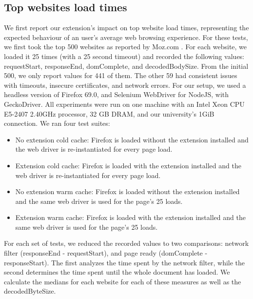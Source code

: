 \subsection{Top websites load times} \label{top_sites}
We first report our extension's impact on top website load times, representing the expected behaviour of an user's average web browsing experience. For these tests, we first took the top 500 websites as reported by Moz.com \cite{top500}. For each website, we loaded it 25 times (with a 25 second timeout) and recorded the following values: requestStart, responseEnd, domComplete, and decodedBodySize. From the initial 500, we only report values for 441 of them. The other 59 had consistent issues with timeouts, insecure certificates, and network errors. For our setup, we used a headless version of Firefox 69.0, and Selenium WebDriver for NodeJS, with GeckoDriver. All experiments were run on one machine with an Intel Xeon CPU E5-2407 2.40GHz processor, 32 GB DRAM, and our university's 1GiB connection. We ran four test suites:
\begin{itemize}
	\item No extension cold cache: Firefox is loaded without the extension installed and the web driver is re-instantiated for every page load.
	\item Extension cold cache: Firefox is loaded with the extension installed and the web driver is re-instantiated for every page load.
	\item No extension warm cache: Firefox is loaded without the extension installed and the same web driver is used for the page's 25 loads.
	\item Extension warm cache: Firefox is loaded with the extension installed and the same web driver is used for the page's 25 loads.
\end{itemize}

For each set of tests, we reduced the recorded values to two comparisons: network filter (responseEnd - requestStart), and page ready (domComplete - responseStart). The first analyzes the time spent by the network filter, while the second determines the time spent until the whole document has loaded. We calculate the medians for each website for each of these measures as well as the decodedByteSize.

